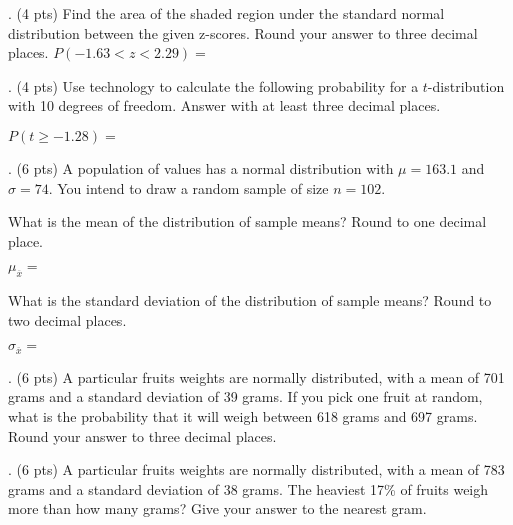 \documentclass{article}
\newcommand{\newquestion}{\vspace{4mm} \noindent}
\begin{document}
\newquestion
4. (4 pts) Find the area of the shaded region under the standard normal 
distribution between the given z-scores. Round your answer to three decimal 
places. \vspace{4mm}
\(P( - 1.63 < z < 2.29) =\)

\pagebreak

\newquestion
5. (4 pts) Use technology to calculate the following probability for a $t$-distribution with 10 degrees of freedom. Answer with at least three decimal places. \vspace{4mm}

\(P(t \geq - 1.28) =\)
\vspace{30mm}

\newquestion
6. (6 pts) A population of values has a normal distribution with \(\mu = 163.1\) and \(\sigma = 74\). You intend to draw a random sample of size \(n = 102\).\vspace{4mm}

\hspace{4mm}What is the mean of the distribution of sample means? Round to one decimal place. \vspace{2mm}

\hspace{8mm}\(\mu_{\overline{x}} =\) \vspace{4mm}

\hspace{4mm}What is the standard deviation of the distribution of sample means? Round to two decimal places. \vspace{2mm}

\hspace{8mm}\(\sigma_{\overline{x}} =\)
\vspace{6mm}

\newquestion
7. (6 pts) A particular fruit\textquotesingle s weights are normally distributed, with a mean of 701 grams and a standard deviation of 39 grams. If you pick one fruit at random, what is the probability that it will weigh between 618 grams and 697 grams. Round your answer to three decimal places.
\vspace{35mm}

\newquestion
8. (6 pts) A particular fruit\textquotesingle s weights are normally distributed, with a mean of 783 grams and a standard deviation of 38 grams. The heaviest 17\% of fruits weigh more than how many grams? Give your answer to the nearest gram.
\vspace{35mm}
\end{document}
